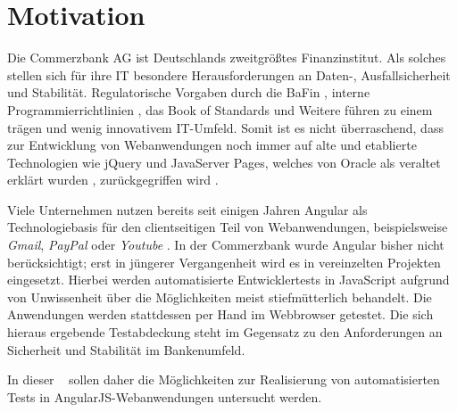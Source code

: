 \section{Motivation}\label{einleitung}
Die Commerzbank AG ist Deutschlands zweitgrößtes Finanzinstitut\cite[][2]{handelsblatt:commerzbank}. Als solches stellen sich für ihre IT besondere Herausforderungen an Daten-, Ausfallsicherheit und Stabilität. Regulatorische Vorgaben durch die BaFin \cite{bafin-banken}, interne Programmierrichtlinien \cite{coba-programmierrichtlinienAllgemein, coba-programmierrichtlinienJavaScript}, das Book of Standards  \cite{coba-bookOfStandards} und Weitere führen zu einem trägen und wenig innovativem IT-Umfeld. Somit ist es nicht überraschend, dass zur Entwicklung von Webanwendungen noch immer auf alte und etablierte Technologien wie jQuery und JavaServer Pages, welches von Oracle als veraltet erklärt wurden  \cite{jsp-deprecated}, zurückgegriffen wird \cite{cosy-mariscv}.

Viele Unternehmen nutzen bereits seit einigen Jahren Angular als Technologiebasis für den clientseitigen Teil von Webanwendungen, beispielsweise \textit{Gmail}, \textit{PayPal} oder \textit{Youtube} \cite{angular-sites}. In der Commerzbank wurde Angular bisher nicht berücksichtigt; erst in jüngerer Vergangenheit wird es in vereinzelten Projekten eingesetzt. Hierbei werden automatisierte Entwicklertests in JavaScript aufgrund von Unwissenheit über die Möglichkeiten meist stiefmütterlich behandelt. Die Anwendungen werden stattdessen per Hand im Webbrowser getestet. Die sich hieraus ergebende Testabdeckung steht im Gegensatz zu den Anforderungen an Sicherheit und Stabilität im Bankenumfeld.

In dieser \titleDocument~ sollen daher die Möglichkeiten zur Realisierung von automatisierten Tests in AngularJS-Webanwendungen untersucht werden.